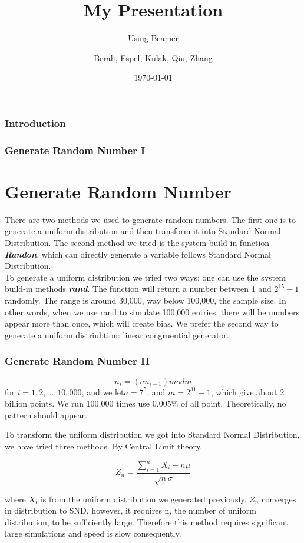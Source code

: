 \documentclass{beamer}
\title{My Presentation}
\subtitle{Using Beamer}
\author{Berah, Espel, Kulak, Qiu, Zhang}
\institute{Imperial College London}
\date{\today}
\begin{document}
\begin{frame}
    \frametitle{Introduction}
    \titlepage
\end{frame}
\begin{frame}
\frametitle{Generate Random Number I}
\section{Generate Random Number}

There are two methods we used to generate random numbers.
The first one is to generate a uniform distribution and then transform it into Standard Normal Distribution. The second method we tried is the system build-in function\textbf{\textit{ Randon}}, which can directly generate a variable follows Standard Normal Distribution.
\\
To generate a uniform distribution we tried two ways: one can use the system build-in methods \textbf{\textit{rand}}. The function will return a number between 1 and $2^{15} -1$ randomly. The range is around 30,000, way below 100,000, the sample size. In other words, when we use rand to simulate 100,000 entries, there will be numbers appear more than once, which will create bias. We prefer the second way to generate a uniform distriubtion: linear congruential generator.
\end{frame}

\begin{frame}
\frametitle{Generate Random Number II}
$$n_i = (an_{i-1})  mod  m$$
for $i=1,2,...,10,000$, and we let$ a = 7^5$, and $m = 2^{31}-1$, which give about 2 billion points. We run 100,000 times use $0.005\%$ of all point. Theoretically, no pattern should appear.

To transform the uniform distribution we got into Standard Normal Distribution, we have tried three methods. By Central Limit theory,

$$ Z_n = \frac{\sum_{i=1}^{n}X_i-n\mu}{\sqrt{n}\sigma}$$

where $X_i$ is from the uniform distribution we generated previously. $Z_n$ converges in distribution to SND, however, it requires n, the number of uniform distribution, to be sufficiently large. Therefore this method requires significant large simulations and speed is slow consequently.
\end{frame}
\end{document}
